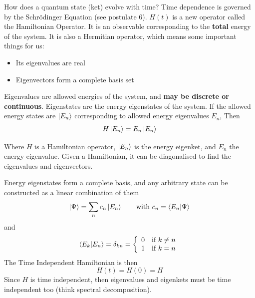 \documentclass[english, 11pt]{article}
\begin{document}
    How does a quantum state (ket) evolve with time? Time dependence is governed by the Schrödinger Equation (see postulate 6). $H(t)$ is a new operator called the Hamiltonian Operator.
    It is an observable corresponding to the \textbf{total} energy of the system. It is also a Hermitian operator, which means some important things for us:
    \begin{itemize}
      \item Its eigenvalues are real
      \item Eigenvectors form a complete basis set
    \end{itemize}
    Eigenvalues are allowed energies of the system, and \textbf{may be discrete or continuous}. Eigenstates are the energy eigenstates of the system. If the allowed energy states are $\left|E_n\right\rangle$ corresponding to allowed energy eigenvalues $E_n$, Then
    \[ H\left|E_n\right\rangle = E_n\left|E_n\right\rangle \]

    Where $H$ is a Hamiltonian operator, $\left|E_n\right\rangle$ is the energy eigenket, and $E_n$ the energy eigenvalue. Given a Hamiltonian, it can be diagonalised to find the eigenvalues and eigenvectors.
    \newline

    Energy eigenstates form a complete basis, and any arbitrary state can be constructed as a linear combination of them
    \[ \ket{\Psi} = \sum_n c_n\ket{E_n} \mbox{ \ \ \ \ \ with } c_n = \braket{E_n}{\Psi} \]
    and
    \[ \braket{E_k}{E_n} = \delta_{kn} = \piecewise{0}{if $k \not = n$}{1}{if $k = n$} \]
    The Time Independent Hamiltonian is then
    \[ H(t) = H(0) = H \]
    Since $H$ is time independent, then eigenvalues and eigenkets must be time independent too (think spectral decomposition).
    \newline
\end{document}
